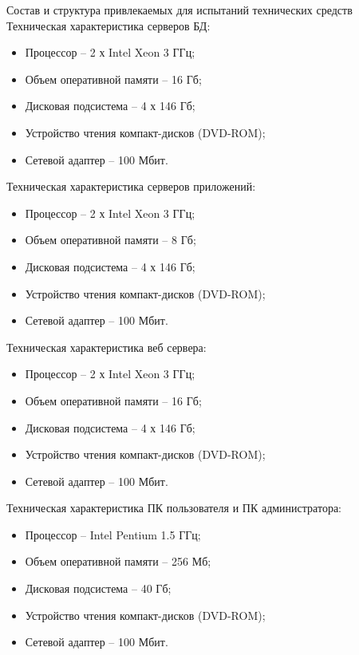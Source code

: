 \documentclass[russian, utf8, 12pt,pointsubsection,floatsubsection]{eskdtext}
\begin{document}
Состав и структура привлекаемых для испытаний технических средств\\
Техническая характеристика серверов БД:
\begin{itemize}
\item Процессор – 2 х Intel Xeon 3 ГГц;
\item Объем оперативной памяти – 16 Гб;
\item Дисковая подсистема – 4 х 146 Гб;
\item Устройство чтения компакт-дисков (DVD-ROM);
\item Сетевой адаптер – 100 Мбит.
\end{itemize}
Техническая характеристика серверов приложений:
\begin{itemize}
\item Процессор – 2 х Intel Xeon 3 ГГц;
\item Объем оперативной памяти – 8 Гб;
\item Дисковая подсистема – 4 х 146 Гб;
\item Устройство чтения компакт-дисков (DVD-ROM);
\item Сетевой адаптер – 100 Мбит.
\end{itemize}
Техническая характеристика  веб сервера:
\begin{itemize}
\item Процессор – 2 х Intel Xeon 3 ГГц;
\item Объем оперативной памяти – 16 Гб;
\item Дисковая подсистема – 4 х 146 Гб;
\item Устройство чтения компакт-дисков (DVD-ROM);
\item Сетевой адаптер – 100 Мбит.
\end{itemize}
Техническая характеристика ПК пользователя и ПК администратора:
\begin{itemize}
\item Процессор – Intel Pentium 1.5 ГГц;
\item Объем оперативной памяти – 256 Мб;
\item Дисковая подсистема – 40 Гб;
\item Устройство чтения компакт-дисков (DVD-ROM);
\item Сетевой адаптер – 100 Мбит.
\end{itemize}
\end{document}
